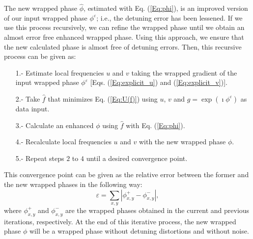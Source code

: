 The new wrapped phase $\hat \phi$, estimated with Eq. (\ref{Eq:phi}), is an 
improved version of our input wrapped phase $\phi^\varepsilon$; i.e., the 
detuning error has been lessened. If we use this process recursively, we can 
refine the wrapped phase until we obtain an almost error free enhanced wrapped 
phase. Using this approach, we ensure that the new calculated phase is almost 
free of detuning errors. Then, this recursive process can be given as: 
\begin{itemize}
\item[1.-] Estimate local frequencies $u$ and $v$ taking the wrapped
  gradient of the input wrapped phase $\phi^\varepsilon$
  [Eqs. (\ref{Eq:explicit_u}) and (\ref{Eq:explicit_v})].
\item[2.-] Take $\hat{f}$ that minimizes Eq. (\ref{Eq:U(f)}) using $u$, 
 $v$ and $g=\exp(\imath\phi^\varepsilon)$ as data input.
\item[3.-] Calculate an enhanced $\phi$ using $\hat{f}$ with
  Eq. (\ref{Eq:phi}).
\item[4.-] Recalculate local frequencies $u$ and $v$ with the new
  wrapped phase $\phi$.
\item[5.-] Repeat steps $2$ to $4$ until a desired convergence point.
\end{itemize}

This convergence point can be given as the relative error between the 
former and the new wrapped phases in the following way:
\begin{equation}
	\varepsilon = \sum_{x,y} \left| \phi_{x,y}^{+} - \phi_{x,y}^{-} 
	\right|,
\end{equation}
where $\phi_{x,y}^{+}$ and $\phi_{x,y}^{-}$ are the wrapped phases obtained in 
the current and previous iterations, respectively. At the end of this 
iterative process, the new wrapped phase $\phi$ will be a wrapped phase without 
detuning distortions and without noise.


